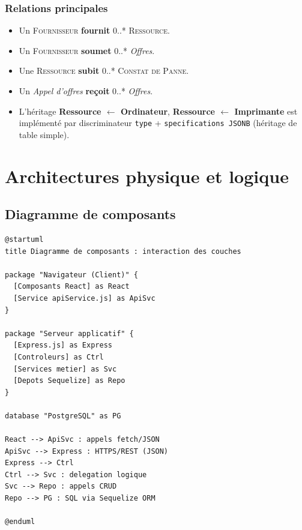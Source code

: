 \documentclass[a4paper,11pt,openany]{report}
\newcommand{\ressource}{\textsc{Ressource}}
\newcommand{\fournisseur}{\textsc{Fournisseur}}
\newcommand{\constat}{\textsc{Constat de Panne}}
\begin{document}
\subsection{Relations principales}

\begin{itemize}
  \item Un \fournisseur{} \textbf{fournit} 0..* \ressource{}.
  \item Un \fournisseur{} \textbf{soumet} 0..* \emph{Offres}.
  \item Une \ressource{} \textbf{subit} 0..* \constat{}.
  \item Un \emph{Appel d'offres} \textbf{reçoit} 0..* \emph{Offres}.
  \item L'héritage \textbf{Ressource $\leftarrow$ Ordinateur},
    \textbf{Ressource $\leftarrow$ Imprimante} est implémenté
    par discriminateur \texttt{type} + \texttt{specifications JSONB}
    (héritage de table simple).
\end{itemize}

\chapter{Architectures physique et logique}

\section{Diagramme de composants}

\begin{lstlisting}[caption={Diagramme UML --- Composants},
                   label={lst:umlComposants}]
@startuml
title Diagramme de composants : interaction des couches

package "Navigateur (Client)" {
  [Composants React] as React
  [Service apiService.js] as ApiSvc
}

package "Serveur applicatif" {
  [Express.js] as Express
  [Controleurs] as Ctrl
  [Services metier] as Svc
  [Depots Sequelize] as Repo
}

database "PostgreSQL" as PG

React --> ApiSvc : appels fetch/JSON
ApiSvc --> Express : HTTPS/REST (JSON)
Express --> Ctrl
Ctrl --> Svc : delegation logique
Svc --> Repo : appels CRUD
Repo --> PG : SQL via Sequelize ORM

@enduml
\end{lstlisting}
\end{document}
